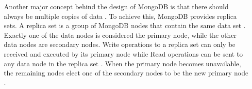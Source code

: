Another major concept behind the design of MongoDB is that there should always be multiple copies of data \parencite[p. 2]{Membrey2014}. To achieve this, MongoDB 
provides replica sets. A replica set is a group of MongoDB nodes that contain the same data set \parencites{Mongo-Replication}[p. 90]{chauhan2019review}. Exactly 
one of the data nodes is considered the primary node, while the other data nodes are secondary nodes. Write operations to a replica set can only be received and
executed by its primary node while Read operations can be sent to any data node in the replica set \parencite{Mongo-Replication}. When the primary node becomes 
unavailable, the remaining nodes elect one of the secondary nodes to be the new primary node \parencite{Mongo-Replication}. 
